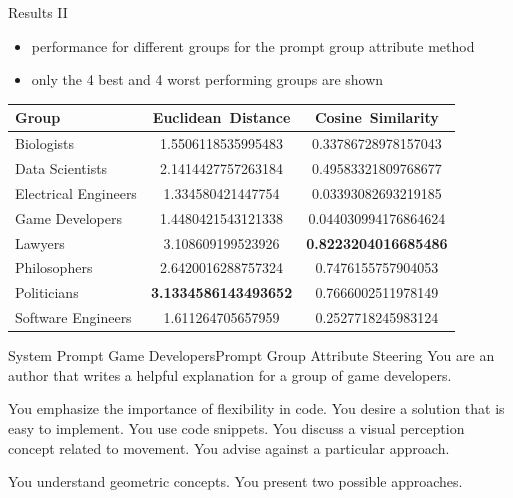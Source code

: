 \documentclass[]{beamer}
\begin{document}
\begin{frame}{Results II}
  \begin{itemize}
    \item performance for different groups for the prompt group attribute method
    \item only the 4 best and 4 worst performing groups are shown
  \end{itemize}
  \begin{tabular}{lSS}
    \toprule
    {Group}              & {Euclidean\ Distance}                              & {Cosine\ Similarity}                               \\
    \midrule
    Biologists           & 1.5506118535995483                                 & 0.33786728978157043                                \\
    Data Scientists      & 2.1414427757263184                                 & 0.49583321809768677                                \\
    Electrical Engineers & 1.334580421447754                                  & 0.03393082693219185                                \\
    Game Developers      & 1.4480421543121338                                 & 0.044030994176864624                               \\
    Lawyers              & 3.108609199523926                                  &  \bfseries 0.8223204016685486 \\
    Philosophers         & 2.6420016288757324                                 & 0.7476155757904053                                 \\
    Politicians          &  \bfseries 3.1334586143493652 & 0.7666002511978149                                 \\
    Software Engineers   & 1.611264705657959                                  & 0.2527718245983124                                 \\
    \bottomrule
  \end{tabular}
\end{frame}

\begin{frame}{System Prompt Game Developers}{Prompt Group Attribute Steering}
  \justifying
  You are an author that writes a helpful explanation for a group of game developers.

  You emphasize the importance of flexibility in code. You desire a solution that is easy to implement. You use code snippets. You discuss a visual perception concept related to movement. You advise against a particular approach.

  You understand geometric concepts. You present two possible approaches.
\end{frame}
\end{document}
